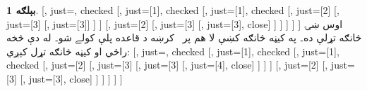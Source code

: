 \documentclass[12pt,a4paper,oneside]{report}
\newenvironment{oltableau}
  {\center\LTR\tableau{}}
  {\endtableau\endLTR\endcenter}
\theoremstyle{definition}
\newtheorem{ex}[thm]{بېلګه}
\begin{document}
\begin{ex}
\begin{oltableau}
  [, just=\TAss, checked
    [,
      just={\TRule{\False}{\lif}[1]}, checked
      [,
        just={\TRule{\False}{\lif}[1]}, checked
        [, just={\TRule{\True}{\lor}[2]}
          [, just={\TRule{\False}{\lif}[3]}
            [, just={\TRule{\False}{\lif}[3]}]
          ]
        ]
        [, just={\TRule{\True}{\lor}[2]}
          [, just={\TRule{\False}{\lif}[3]}
            [, just={\TRule{\False}{\lif}[3]}, close]
          ]
        ]
      ]
    ]
  ]
\end{oltableau}
اوس ښۍ څانګه تړلې ده۔ په کيڼه څانګه کښې لا هم پر~ کرښه د
\LR{$\TRule{\True}{\lnot}$} قاعده پلې کولے شو۔ له دې څخه
 راځي او کيڼه څانګه تړل کېږي:
\begin{oltableau}
  [, just=\TAss, checked
    [,
      just={\TRule{\False}{\lif}[1]}, checked
      [,
        just={\TRule{\False}{\lif}[1]}, checked
        [, just={\TRule{\True}{\lor}[2]}
          [, just={\TRule{\False}{\lif}[3]}
            [, just={\TRule{\False}{\lif}[3]}
              [,
                just={\TRule{\True}{\lnot}[4]}, close]
            ]
          ]
        ]
        [, just={\TRule{\True}{\lor}[2]}
          [, just={\TRule{\False}{\lif}[3]}
            [,
              just={\TRule{\False}{\lif}[3]}, close]
          ]
        ]
      ]
    ]
  ]
\end{oltableau}
\end{ex}
\label{olpseg:OLP-0103-B011:end}
\end{document}
